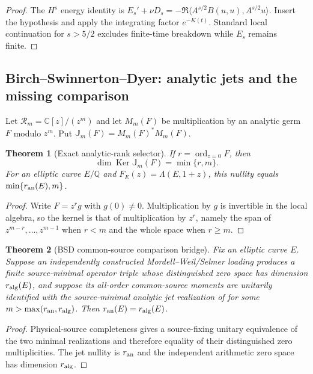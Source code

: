 \documentclass[11pt]{article}
\newtheorem{theorem}{Theorem}[section]
\theoremstyle{definition}
\theoremstyle{remark}
\newcommand{\C}{\mathbb C}
\newcommand{\Ker}{\operatorname{Ker}}
\begin{document}
\begin{proof}
The $H^s$ energy identity is
$E_s'+\nu D_s=-\Re\langle A^{s/2}B(u,u),A^{s/2}u\rangle$.
Insert the hypothesis and apply the integrating factor $e^{-K(t)}$.
Standard local continuation for $s>5/2$ excludes finite-time breakdown while
$E_s$ remains finite.
\end{proof}

\subsection{Birch--Swinnerton--Dyer: analytic jets and the missing comparison}

Let $\mathscr R_m=\C[z]/(z^m)$ and let $M_m(F)$ be multiplication by an
analytic germ $F$ modulo $z^m$.  Put
$\mathbb J_m(F)=M_m(F)^*M_m(F)$.

\begin{theorem}[Exact analytic-rank selector]
\label{thm:BSD-jet-master}
If $r=\operatorname{ord}_{z=0}F$, then
\[
 \boxed{\dim\Ker\mathbb J_m(F)=\min\{r,m\}.}
\]
For an elliptic curve $E/\mathbb Q$ and
$F_E(z)=\Lambda(E,1+z)$, this nullity equals
$\min\{r_{\rm an}(E),m\}$.
\end{theorem}

\begin{proof}
Write $F=z^rg$ with $g(0)\ne0$.  Multiplication by $g$ is invertible in the
local algebra, so the kernel is that of multiplication by $z^r$, namely the
span of $z^{m-r},\ldots,z^{m-1}$ when $r<m$ and the whole space when
$r\ge m$.
\end{proof}

\begin{theorem}[BSD common-source comparison bridge]
\label{thm:BSD-bridge-master}
Fix an elliptic curve $E$.  Suppose an independently constructed
Mordell--Weil/Selmer loading produces a finite source-minimal operator triple
whose distinguished zero space has dimension $r_{\rm alg}(E)$, and suppose
its all-order common-source moments are unitarily identified with the
source-minimal analytic jet realization of  for
some $m>\max(r_{\rm an},r_{\rm alg})$.  Then
$r_{\rm an}(E)=r_{\rm alg}(E)$.
\end{theorem}

\begin{proof}
Physical-source completeness gives a source-fixing unitary equivalence of the
two minimal realizations and therefore equality of their distinguished zero
multiplicities.  The jet nullity is $r_{\rm an}$ and the independent
arithmetic zero space has dimension $r_{\rm alg}$.
\end{proof}
\end{document}
